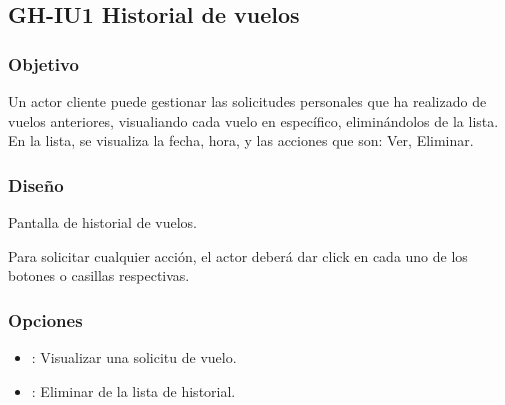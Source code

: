 %

\subsection{GH-IU1 Historial de vuelos}

\subsubsection{Objetivo}
	Un actor cliente puede gestionar las solicitudes personales que ha 
realizado de vuelos anteriores, visualiando cada vuelo en específico, 
eliminándolos de la lista. En la lista, se visualiza la fecha, hora, y las 
acciones que son: Ver, Eliminar.

\subsubsection{Diseño}

{Pantalla de historial de vuelos.} 

	Para solicitar cualquier acción, el actor deberá dar click en cada uno 
de los botones o casillas respectivas.

\subsubsection{Opciones}
\begin{itemize}
	\item {}: Visualizar una solicitu de vuelo.
	\item {}: Eliminar de la lista de historial.
\end{itemize}
